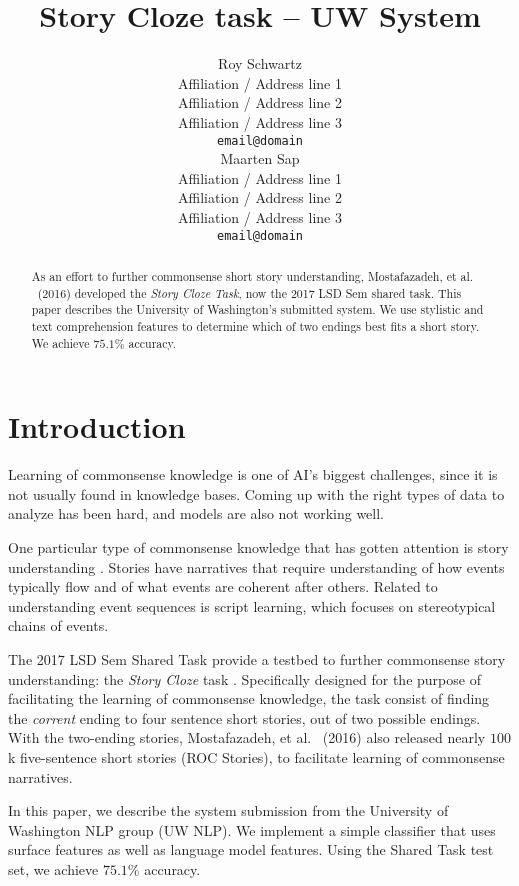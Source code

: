 \documentclass[11pt]{article}
\title{Story Cloze task -- UW System}
\author{Roy Schwartz\\
  Affiliation / Address line 1 \\
  Affiliation / Address line 2 \\
  Affiliation / Address line 3 \\
  {\tt email@domain} \\\And	
  Maarten Sap \\
  Affiliation / Address line 1 \\
  Affiliation / Address line 2 \\
  Affiliation / Address line 3 \\
  {\tt email@domain} \\}
\date{}
\begin{document}
\maketitle
\begin{abstract} %
As an effort to further commonsense short story understanding, Mostafazadeh, et al. ~(2016)\nocite{Mostafazadeh:2016} developed the \textit{Story Cloze Task}, now the 2017 LSD Sem shared task. This paper describes the University of Washington's submitted system.
We use stylistic and text comprehension features to determine which of two endings best fits a short story.
We achieve $75.1\%$ accuracy.
\end{abstract}

\section{Introduction}

Learning of commonsense knowledge is one of AI's biggest challenges, since it is not usually found in knowledge bases.
Coming up with the right types of data to analyze has been hard, and models are also not working well.

One particular type of commonsense knowledge that has gotten attention is story understanding \cite{??}. Stories have narratives that require understanding of how events typically flow and of what events are coherent after others.
Related to understanding event sequences is script learning, which focuses on stereotypical chains of events.

The 2017 LSD Sem Shared Task provide a testbed to further commonsense story understanding: the \textit{Story Cloze} task \cite{Mostafazadeh:2016}. Specifically designed for the purpose of facilitating the learning of commonsense knowledge, the task consist of finding the \textit{corrent} ending to four sentence short stories, out of two possible endings. 
With the two-ending stories, Mostafazadeh, et al. ~(2016)\nocite{Mostafazadeh:2016} also released nearly $100$k five-sentence short stories (ROC Stories), to facilitate learning of commonsense narratives.

In this paper, we describe the system submission from the University of Washington NLP group (UW NLP).
We implement a simple classifier that uses surface features as well as language model features. Using the Shared Task test set, we achieve $75.1\%$ accuracy.
\end{document}

